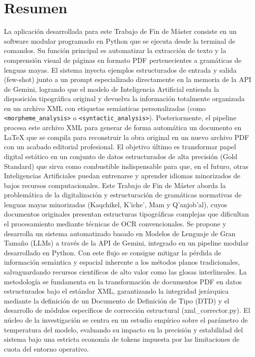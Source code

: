 \chapter{Resumen}

La aplicación desarrollada para este Trabajo de Fin de Máster consiste en un software modular programado en Python que se ejecuta desde la terminal de comandos. Su función principal es automatizar la extracción de texto y la comprensión visual de páginas en formato PDF pertenecientes a gramáticas de lenguas mayas. El sistema inyecta ejemplos estructurados de entrada y salida (few-shot) junto a un prompt especializado directamente en la memoria de la API de Gemini, logrando que el modelo de Inteligencia Artificial entienda la disposición tipográfica original y devuelva la información totalmente organizada en un archivo XML con etiquetas semánticas personalizadas
(como \texttt{\textless morpheme\_analysis\textgreater} o \texttt{\textless syntactic\_analysis\textgreater}).
Posteriormente, el pipeline procesa este archivo XML para generar de forma automática un documento en LaTeX que se compila para reconstruir la obra original en un nuevo archivo PDF con un acabado editorial profesional. El objetivo último es transformar papel digital estático en un conjunto de datos estructurados de alta precisión (Gold Standard) que sirva como combustible indispensable para que, en el futuro, otras Inteligencias Artificiales puedan entrenarse y aprender idiomas minorizados de bajos recursos computacionales.
Este Trabajo de Fin de Máster aborda la problemática de la digitalización y estructuración de gramáticas normativas de lenguas mayas minorizadas (Kaqchikel, K’iche’, Mam y Q’anjob’al), cuyos documentos originales presentan estructuras tipográficas complejas que dificultan el procesamiento mediante técnicas de OCR convencionales. Se propone y desarrolla un sistema automatizado basado en Modelos de Lenguaje de Gran Tamaño (LLMs) a través de la API de Gemini, integrado en un pipeline modular desarrollado en Python. Con este flujo se consigue mitigar la pérdida de información semántica y espacial inherente a los métodos planos tradicionales, salvaguardando recursos científicos de alto valor como las glosas interlineales.
La metodología se fundamenta en la transformación de documentos PDF en datos estructurados bajo el estándar XML, garantizando la integridad jerárquica mediante la definición de un Documento de Definición de Tipo (DTD) y el desarrollo de módulos específicos de corrección estructural (xml\_corrector.py). El núcleo de la investigación se centra en un estudio empírico sobre el parámetro de temperatura del modelo, evaluando su impacto en la precisión y estabilidad del sistema bajo una estricta economía de tokens impuesta por las limitaciones de cuota del entorno operativo.
